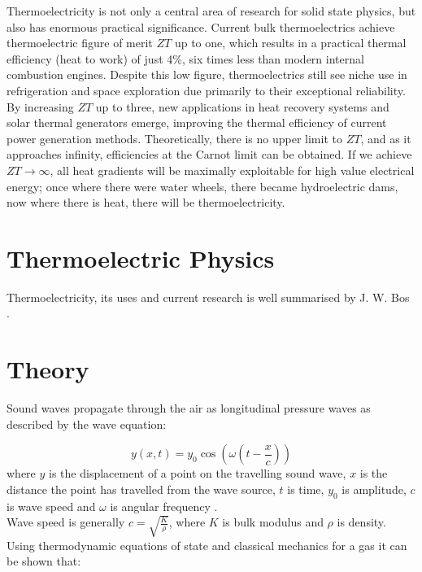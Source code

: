 \documentclass[a4paper,10pt,journal]{IEEEtran}
\begin{document}
Thermoelectricity is not only a central area of research for solid
state physics, but also has enormous practical significance. Current
bulk thermoelectrics achieve thermoelectric figure of merit $ZT$ up to
one, which results in a practical thermal efficiency (heat to work) of
just 4\%, six times less than modern internal combustion engines.
Despite this low figure, thermoelectrics still see niche use
in refrigeration and space exploration due primarily to their
exceptional reliability. By increasing $ZT$ up to three, new
applications in heat recovery systems and solar thermal generators
emerge, improving the thermal efficiency of current power generation
methods. Theoretically, there is no upper limit to $ZT$, and as it
approaches infinity, efficiencies at the Carnot limit can be obtained.
If we achieve $ZT \to\infty$, all heat gradients will be maximally
exploitable for high value electrical energy; once where there were
water wheels, there became hydroelectric dams, now where there is
heat, there will be thermoelectricity.

\section{Thermoelectric Physics}



Thermoelectricity, its uses and current research is well summarised by
J. W. Bos \cite{rsc-eic}.


\section{Theory}
Sound waves propagate through the air as longitudinal pressure waves as described by the wave equation:

\begin{equation}
\label{eq:sound-wave}
	y(x,t) = y_0 \cos(\omega(t-\frac{x}{c}))
\end{equation}
where $y$ is the displacement of a point on the travelling sound wave, $x$ is the distance the point has travelled from the wave source, $t$ is time, $y_0$ is amplitude, $c$ is wave speed and $\omega$ is angular frequency \cite{young-book}.\\
Wave speed is generally $c = \sqrt{\frac{K}{\rho}}$, where $K$ is bulk modulus and $\rho$ is density. Using thermodynamic equations of state and classical mechanics for a gas it can be shown that:
\end{document}
